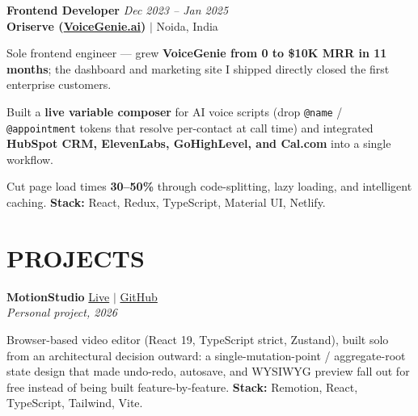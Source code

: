 \documentclass[a4paper,10pt]{article}
\begin{document}
\vspace{3pt}

\textbf{Frontend Developer} \hfill \textit{Dec 2023 -- Jan 2025}\\
\textbf{Oriserve (\href{https://voicegenie.ai/}{VoiceGenie.ai})} $|$ Noida, India

\vspace{2pt}
\begin{itemize}[leftmargin=0.15in, itemsep=1pt]
    \small{\item
    Sole frontend engineer --- grew \textbf{VoiceGenie from 0 to \$10K MRR in 11 months}; the dashboard and marketing site I shipped directly closed the first enterprise customers.
    }

    \small{\item
    Built a \textbf{live variable composer} for AI voice scripts (drop \texttt{@name} / \texttt{@appointment} tokens that resolve per-contact at call time) and integrated \textbf{HubSpot CRM, ElevenLabs, GoHighLevel, and Cal.com} into a single workflow.
    }

    \small{\item
    Cut page load times \textbf{30--50\%} through code-splitting, lazy loading, and intelligent caching. \textbf{Stack:} React, Redux, TypeScript, Material UI, Netlify.
    }
\end{itemize}

\vspace{3pt}

\section{PROJECTS}

\textbf{MotionStudio} \hfill \href{https://motionstudio-six.vercel.app/}{Live} $|$ \href{https://github.com/BLAZE7SHADOW/MotionStudio}{GitHub}\\
\textit{Personal project, 2026}

\vspace{2pt}
\begin{itemize}[leftmargin=0.15in, itemsep=1pt]
    \small{\item
    Browser-based video editor (React 19, TypeScript strict, Zustand), built solo from an architectural decision outward: a single-mutation-point / aggregate-root state design that made undo-redo, autosave, and WYSIWYG preview fall out for free instead of being built feature-by-feature. \textbf{Stack:} Remotion, React, TypeScript, Tailwind, Vite.
    }
\end{itemize}
\end{document}
